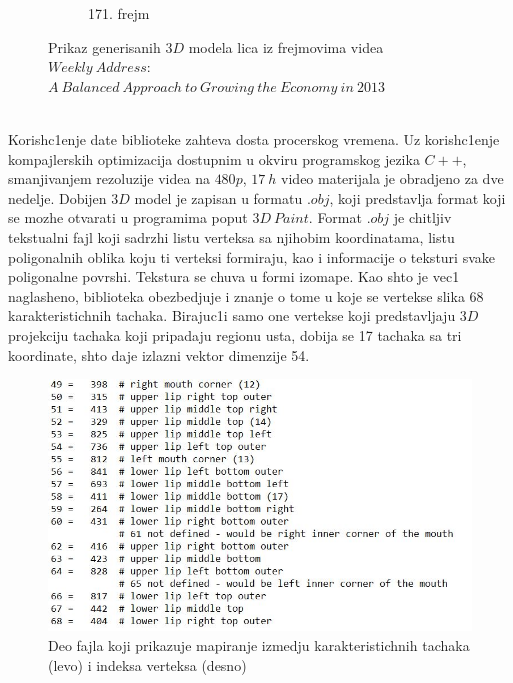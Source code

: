 \documentclass[a4paper, openany, oneside, 11pt]{book}
\begin{document}
\begin{figure}[!h]
\begin{subfigure}{0.475\textwidth}
            \caption{171. frejm}
            \label{fig:2_7d}
            \vspace{0pt}
        \end{subfigure}
        \caption{Prikaz generisanih $3D$ modela lica iz frejmovima videa $Weekly\ Address$: $A\ Balanced\ Approach\ to\ Growing\ the\ Economy\ in\ 2013$}
        \label{fig:2_7}
\end{figure}\\
Korish\-c1enje date biblioteke zahteva dosta procerskog vremena. Uz korish\-c1enje kompajlerskih optimizacija dostupnim u okviru programskog jezika $C++$, smanjivanjem rezoluzije videa na $480p$, $\SI{17}{h}$ video materijala je obradjeno za dve nedelje. Dobijen $3D$ model je zapisan u formatu $.obj$, koji predstavlja format koji se mozhe otvarati u programima poput $3D\ Paint$. Format $.obj$ je chitljiv tekstualni fajl \cite{obj} koji sadrzhi listu verteksa sa njihobim koordinatama, listu poligonalnih oblika koju ti verteksi formiraju, kao i informacije o teksturi svake poligonalne povrshi. Tekstura se chuva u formi izomape. Kao shto je vec1 naglasheno, biblioteka obezbedjuje i znanje o tome u koje se vertekse slika 68 karakteristichnih tachaka. Birajuc1i samo one vertekse koji predstavljaju $3D$ projekciju tachaka koji pripadaju regionu usta, dobija se 17 tachaka sa tri koordinate, shto daje izlazni vektor dimenzije 54.
\begin{figure}[h!]
\centering
  \includegraphics[scale=0.7]{res/iBUG68toSFM.jpg}
  \caption{Deo fajla koji prikazuje mapiranje izmedju karakteristichnih tachaka (levo) i indeksa verteksa (desno)}
  \label{fig:2_8}
  \vspace{0pt}
\end{figure}\\
\end{document}
